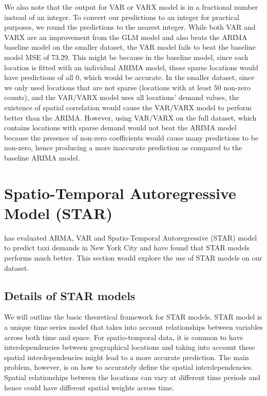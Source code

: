 \documentclass[nonblindrev,msom]{informs3} %
\begin{document}
We also note that the output for VAR or VARX model is in a fractional number instead of an integer. To convert our predictions to an integer for practical purposes, we round the predictions to the nearest integer. While both VAR and VARX are an improvement from the GLM model and also beats the ARIMA baseline model on the smaller dataset, the VAR model fails to beat the baseline model MSE of 73.29. This might be because in the baseline model, since each location is fitted with an individual ARIMA model, those sparse locations would have predictions of all 0, which would be accurate. In the smaller dataset, since we only used locations that are not sparse (locations with at least 50 non-zero counts), and the VAR/VARX model uses all locations' demand values, the existence of spatial correlation would cause the VAR/VARX model to perform better than the ARIMA. However, using VAR/VARX on the full dataset, which contains locations with sparse demand would not beat the ARIMA model because the presence of non-zero coefficients would cause many predictions to be non-zero, hence producing a more inaccurate prediction as compared to the baseline ARIMA model. \\


\newpage

\section{Spatio-Temporal Autoregressive Model (STAR)}

\cite{Abolfazl2017} has evaluated ARMA, VAR and Spatio-Temporal Autoregressive (STAR) model to predict taxi demands in New York City and have found that STAR models performs much better. This section would explore the use of STAR models on our dataset. \\

\subsection{Details of STAR models}

\noindent We will outline the basic theoretical framework for STAR models. STAR model is a unique time series model that takes into account relationships between variables across both time and space. For spatio-temporal data, it is common to have interdependencies between geographical locations and taking into account these spatial interdependencies might lead to a more accurate prediction. The main problem, however, is on how to accurately define the spatial interdependencies. Spatial relationships between the locations can vary at different time periods and hence could have different spatial weights across time.  \\
\end{document}
